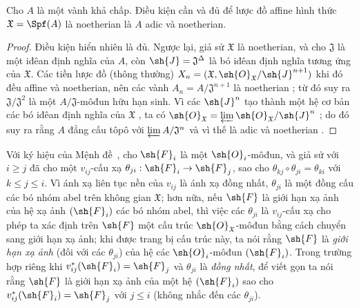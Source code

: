 \documentclass[oneside]{amsart}
\makeatletter
\renewcommand{\leq}{\leqslant}
\renewcommand{\geq}{\geqslant}
\newcommand{\ega@arrow}[2]{\mathchoice{#1}{#2}{#2}{#2}}
\renewcommand{\to}{\ega@arrow{\longrightarrow}{\rightarrow}}
\let\EGAOriginalLabel\label
\renewcommand{\label}[1]{\phantomsection\EGAOriginalLabel{#1}}
\makeatother
\begin{document}
\begin{corollary}[10.6.5]
\label{I.10.6.5}
Cho $A$ là một vành khả chấp.
Điều kiện cần và đủ để lược đồ affine hình thức $\mathfrak{X}=\Spf(A)$ là noetherian là $A$ adic và noetherian.
\end{corollary}

\begin{proof}
Điều kiện hiển nhiên là đủ.
Ngược lại, giả sử $\mathfrak{X}$ là noetherian, và cho $\mathfrak{J}$ là một iđêan định nghĩa của $A$, còn $\sh{J}=\mathfrak{J}^\Delta$ là bó iđêan định nghĩa tương ứng của $\mathfrak{X}$.
Các tiền lược đồ (thông thường) $X_n=(\mathfrak{X},\sh{O}_\mathfrak{X}/\sh{J}^{n+1})$ khi đó đều affine và noetherian, nên các vành $A_n=A/\mathfrak{J}^{n+1}$ là noetherian ; từ đó suy ra $\mathfrak{J}/\mathfrak{J}^2$ là một $A/\mathfrak{J}$-môđun hữu hạn sinh.
Vì các $\sh{J}^n$ tạo thành một hệ cơ bản các bó iđêan định nghĩa của $\mathfrak{X}$ , ta có $\sh{O}_\mathfrak{X}=\varprojlim\sh{O}_\mathfrak{X}/\sh{J}^n$ ; do đó suy ra  rằng $A$ đẳng cấu tôpô với $\varprojlim A/\mathfrak{J}^n$ và vì thế là adic và noetherian .
\end{proof}

\begin{remark}[10.6.6]
\label{I.10.6.6}
Với ký hiệu của Mệnh đề~, cho $\sh{F}_i$ là một $\sh{O}_i$-môđun, và giả sử với $i\geq j$ đã cho một $v_{ij}$-cấu xạ $\theta_{ji}:\sh{F}_i\to\sh{F}_j$, sao cho $\theta_{kj}\circ\theta_{ji}=\theta_{ki}$ với $k\leq j\leq i$.
Vì ánh xạ liên tục nền của $v_{ij}$ là ánh xạ đồng nhất, $\theta_{ji}$ là một đồng cấu các bó nhóm abel trên không gian $\mathfrak{X}$; hơn nữa, nếu $\sh{F}$ là giới hạn xạ ảnh của hệ xạ ảnh $(\sh{F}_i)$ các bó nhóm abel, thì việc các $\theta_{ji}$ là $v_{ij}$-cấu xạ cho phép ta xác định trên $\sh{F}$ một cấu trúc $\sh{O}_\mathfrak{X}$-môđun bằng cách chuyển sang giới hạn xạ ảnh; khi được trang bị cấu trúc này, ta nói rằng $\sh{F}$ là \emph{giới hạn xạ ảnh} (đối với các $\theta_{ji}$) của hệ các $\sh{O}_i$-môđun $(\sh{F}_i)$.
Trong trường hợp riêng khi $v_{ij}^*(\sh{F}_i)=\sh{F}_j$ và $\theta_{ji}$ là \emph{đồng nhất}, để viết gọn ta nói rằng $\sh{F}$ là giới hạn xạ ảnh của một hệ $(\sh{F}_i)$ sao cho $v_{ij}^*(\sh{F}_i)=\sh{F}_j$ với $j\leq i$ (không nhắc đến các $\theta_{ji}$).
\end{remark}
\end{document}
